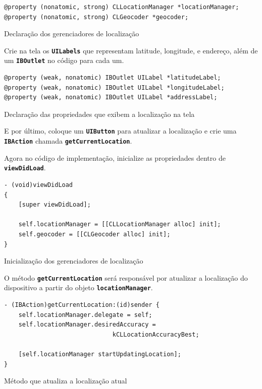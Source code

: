 \documentclass[a4paper,12pt,brazil,oneside]{book}
\begin{document}
\begin{listing}[H]
\begin{verbatim}
@property (nonatomic, strong) CLLocationManager *locationManager;
@property (nonatomic, strong) CLGeocoder *geocoder;
\end{verbatim}
\caption{Declaração dos gerenciadores de localização}
\end{listing}


Crie na tela os \texttt{\textbf{UILabels}} que representam latitude, longitude, e endereço, além de um \texttt{\textbf{IBOutlet}} no código para cada um.

\begin{listing}[H]
\begin{verbatim}
@property (weak, nonatomic) IBOutlet UILabel *latitudeLabel;
@property (weak, nonatomic) IBOutlet UILabel *longitudeLabel;
@property (weak, nonatomic) IBOutlet UILabel *addressLabel;
\end{verbatim}
\caption{Declaração das propriedades que exibem a localização na tela}
\end{listing}


E por último, coloque um \texttt{\textbf{UIButton}} para atualizar a localização e crie uma \texttt{\textbf{IBAction}} chamada \texttt{\textbf{getCurrentLocation}}.

Agora no código de implementação, inicialize as propriedades dentro de \texttt{\textbf{viewDidLoad}}.

\begin{listing}[H]
\begin{verbatim}
- (void)viewDidLoad
{
    [super viewDidLoad];
    
    self.locationManager = [[CLLocationManager alloc] init];
    self.geocoder = [[CLGeocoder alloc] init];
}
\end{verbatim}
\caption{Inicialização dos gerenciadores de localização}
\end{listing}


O método \texttt{\textbf{getCurrentLocation}} será responsável por atualizar a localização do dispositivo a partir do objeto \texttt{\textbf{locationManager}}.

\begin{listing}[H]
\begin{verbatim}
- (IBAction)getCurrentLocation:(id)sender {
    self.locationManager.delegate = self;
    self.locationManager.desiredAccuracy =
                              kCLLocationAccuracyBest;
    
    [self.locationManager startUpdatingLocation];
}
\end{verbatim}
\caption{Método que atualiza a localização atual}
\end{listing}
\end{document}
